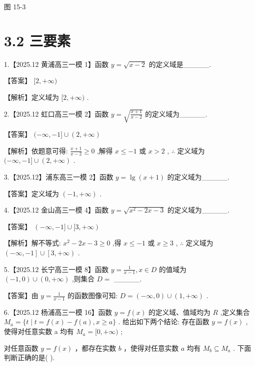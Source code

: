 \documentclass[10pt]{article}
\newcommand*\circled[1]{\tikz[baseline=(char.base)]{\node[shape=circle,draw,inner sep=1.5pt] (char) {\small #1};}}
\begin{document}
图 15-3

\section*{3.2 三要素}

1.【2025.12 黄浦高三一模 1】函数 \(y = \sqrt{x - 2}\) 的定义域是\_\_\_\_\_.

【答案】 \(\lbrack 2, + \infty )\)

【解析】定义域为 \(\lbrack 2, + \infty )\) .

2.【2025.12 虹口高三一模 2】函数 \(y = \sqrt{\frac{x + 1}{x - 2}}\) 的定义域为\_\_\_\_\_.

【答案】 \(( - \infty , - 1\rbrack  \cup  \left( {2, + \infty }\right)\)

【解析】依题意可得: \(\frac{x + 1}{x - 2} \geq  0\) ,解得 \(x \leq   - 1\) 或 \(x > 2\) , \(\therefore\) 定义域为 \(( - \infty , - 1\rbrack  \cup  \left( {2, + \infty }\right)\) .

3.【2025.12】浦东高三一模 2】函数 \(y = \lg \left( {x + 1}\right)\) 的定义域为\_\_\_\_\_.

【答案】定义域为 \(\left( {-1, + \infty }\right)\) .

4.【2025.12 金山高三一模 4】函数 \(y = \sqrt{{x}^{2} - {2x} - 3}\) 的定义域为\_\_\_\_\_.

【答案】 \(\left( {-\infty , - 1\rbrack \cup \lbrack 3, + \infty }\right)\)

【解析】解不等式: \({x}^{2} - {2x} - 3 \geq  0\) ,得 \(x \leq   - 1\) 或 \(x \geq  3\) , \(\therefore\) 定义域为 \(\left( {-\infty , - 1}\right\rbrack   \cup  \left\lbrack  {3, + \infty }\right)\) .

5.【2025.12 长宁高三一模 8】函数 \(y = \frac{1}{x - 1},x \in  D\) 的值域为 \(\left( {-1,0}\right)  \cup  \left( {0, + \infty }\right)\) ,则集合 \(D =\) \_\_\_\_\_.

【答案】由 \(y = \frac{1}{x - 1}\) 的函数图像可知: \(D = \left( {-\infty ,0}\right)  \cup  \left( {1, + \infty }\right)\) .

6.【2025.12 杨浦高三一模 16】函数 \(y = f\left( x\right)\) 的定义域、值域均为 \(R\) ,定义集合 \({M}_{a} = \{ t \mid  t = f\left( x\right)  - f\left( a\right) ,x \geq  a\}\) . 给出如下两个结论:  \circled{1} 存在函数 \(y = f\left( x\right)\) ,使得对任意实数 a 均有 \({M}_{a} = \lbrack 0, + \infty )\) ;

 \circled{2} 对任意函数 \(y = f\left( x\right)\) ，都存在实数 \(b\) ，使得对任意实数 \(a\) 均有 \({M}_{b} \subseteq  {M}_{a}\) . 下面判断正确的是( ).
\end{document}

